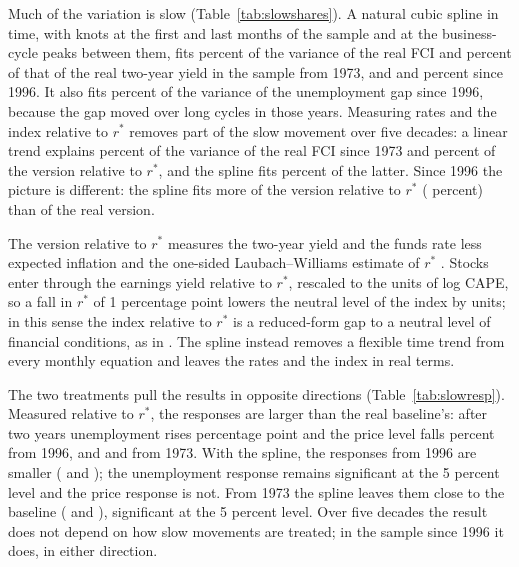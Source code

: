 \documentclass[11pt]{article}
\newcommand{\rs}{r^{*}}
\begin{document}


Much of the variation is slow (Table~\ref{tab:slowshares}). A natural cubic spline in time, with knots at the first and last months of the sample and at the business-cycle peaks between them, fits  percent of the variance of the real FCI and  percent of that of the real two-year yield in the sample from 1973, and  and  percent since 1996. It also fits  percent of the variance of the unemployment gap since 1996, because the gap moved over long cycles in those years. Measuring rates and the index relative to $\rs$ removes part of the slow movement over five decades: a linear trend explains  percent of the variance of the real FCI since 1973 and  percent of the version relative to $\rs$, and the spline fits  percent of the latter. Since 1996 the picture is different: the spline fits more of the version relative to $\rs$ ( percent) than of the real version.

The version relative to $\rs$ measures the two-year yield and the funds rate less expected inflation and the one-sided Laubach--Williams estimate of $\rs$ \citep{laubach2003}. Stocks enter through the earnings yield relative to $\rs$, rescaled to the units of log CAPE, so a fall in $\rs$ of 1 percentage point lowers the neutral level of the index by  units; in this sense the index relative to $\rs$ is a reduced-form gap to a neutral level of financial conditions, as in \citet{caballero2026}. The spline instead removes a flexible time trend from every monthly equation and leaves the rates and the index in real terms.



The two treatments pull the results in opposite directions (Table~\ref{tab:slowresp}). Measured relative to $\rs$, the responses are larger than the real baseline's: after two years unemployment rises  percentage point and the price level falls  percent from 1996, and  and  from 1973. With the spline, the responses from 1996 are smaller ( and ); the unemployment response remains significant at the 5 percent level and the price response is not. From 1973 the spline leaves them close to the baseline ( and ), significant at the 5 percent level. Over five decades the result does not depend on how slow movements are treated; in the sample since 1996 it does, in either direction.
\end{document}
